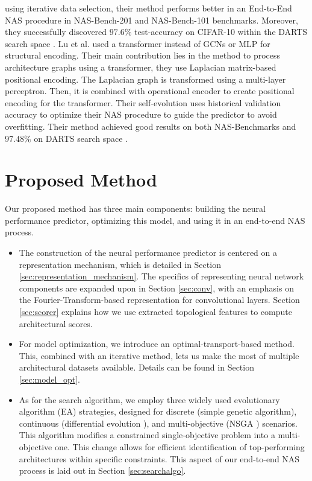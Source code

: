 \documentclass[lettersize,journal]{IEEEtran}
\begin{document}
using iterative data selection, their method performs better in an End-to-End NAS procedure in NAS-Bench-201 \cite{nb201} and NAS-Bench-101 \cite{nb101} benchmarks. Moreover, they successfully discovered $97.6\%$ test-accuracy on CIFAR-10 \cite{cifar} within the DARTS search space \cite{DARTS}. Lu et al. \cite{TNASP} used a transformer instead of GCNs or MLP for structural encoding. Their main contribution lies in the method to process architecture graphs using a transformer, they use Laplacian matrix-based positional encoding. The Laplacian graph is transformed using a multi-layer perceptron. Then, it is combined with operational encoder to create positional encoding for the transformer. Their self-evolution uses historical validation accuracy to optimize their NAS procedure to guide the predictor to avoid overfitting. Their method achieved good results on both NAS-Benchmarks and $97.48\%$ on DARTS search space \cite{DARTS}.











\section{Proposed Method} \label{sec:method}








Our proposed method has three main components: building the neural performance predictor, optimizing this model, and using it in an end-to-end NAS process.

\begin{itemize}
    \item The construction of the neural performance predictor is centered on a representation mechanism, which is detailed in Section \ref{sec:representation_mechanism}. The specifics of representing neural network components are expanded upon in Section \ref{sec:conv}, with an emphasis on the Fourier-Transform-based representation for convolutional layers. Section \ref{sec:scorer} explains how we use extracted topological features to compute architectural scores.

    \item For model optimization, we introduce an optimal-transport-based method. This, combined with an iterative method, lets us make the most of multiple architectural datasets available. Details can be found in Section \ref{sec:model_opt}.

    \item As for the search algorithm, we employ three widely used evolutionary algorithm (EA) strategies, designed for discrete (simple genetic algorithm), continuous (differential evolution \cite{DE}), and multi-objective (NSGA \cite{NSGA}) scenarios. This algorithm modifies a constrained single-objective problem into a multi-objective one. This change allows for efficient identification of top-performing architectures within specific constraints. This aspect of our end-to-end NAS process is laid out in Section \ref{sec:searchalgo}.
\end{itemize}
\end{document}
